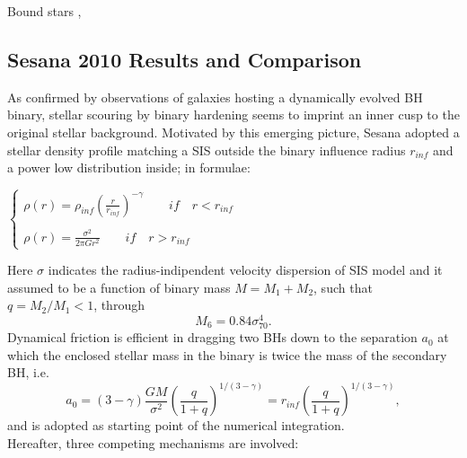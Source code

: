 \documentclass[12pt,twoside,openany]{book}
\begin{document}
Bound stars \cite{Sesana_2008}     ,\cite{Sesana_2010}
\newpage
\subsection{Sesana 2010 Results and  Comparison}
As confirmed by observations of galaxies hosting a dynamically evolved BH binary, stellar scouring by binary hardening seems to imprint an inner cusp to the original stellar background. Motivated by this emerging picture, Sesana \cite{Sesana_2010} adopted a stellar density profile matching a SIS outside the binary influence radius $r_{inf}$ and a power low distribution inside; in formulae:
\begin{flushleft}\label{Sesana_2010 stellar cusp profile}
  $
  \left\{
  \begin{aligned}
  \rho(r)=\rho_{inf}\left(\frac{r}{r_{inf}}\right)^{-\gamma} \qquad if \quad r<r_{inf}\\
  \\ \rho(r)=\frac{\sigma^2}{2\pi G r^2} \qquad if \quad r>r_{inf}
  \end{aligned}
  \right.
  $
  \end{flushleft}
Here $\sigma$ indicates the radius-indipendent velocity dispersion of SIS model and it assumed to be a function of binary mass $M=M_1+M_2$, such that $q=M_2/M_1<1$, through \cite{Tremaine_2002}
\begin{equation}\label{Tremaine_2002 M_bh}
    M_6=0.84\sigma_{70}^4.
\end{equation}
Dynamical friction is efficient in dragging two BHs down to the separation $a_0$ at which the enclosed stellar mass
in the binary is twice the mass of the secondary BH, i.e.  
\begin{equation}\label{Sesana_2010 a_0}
    a_0=(3-\gamma)\frac{GM}{\sigma^2}\left(\frac{q}{1+q}\right)^{1/(3-\gamma)}=r_{inf}\left(\frac{q}{1+q}\right)^{1/(3-\gamma)},
\end{equation}
and is adopted as starting point of the numerical integration.\\Hereafter, three competing mechanisms are involved:
\end{document}
